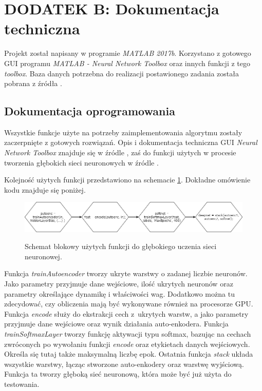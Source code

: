 \section{DODATEK B: Dokumentacja techniczna}
\label{sub:dodatekB}

Projekt został napisany w programie \textit{MATLAB 2017b}. Korzystano z gotowego GUI programu \textit{MATLAB - Neural Network Toolbox} oraz innych funkcji z tego \textit{toolbox}. Baza danych potrzebna do realizacji postawionego zadania została pobrana z źródła \cite{baza_down}.

\subsection{Dokumentacja oprogramowania}
\label{sub:dokumentacja}

Wszystkie funkcje użyte na potrzeby zaimplementowania algorytmu zostały zaczerpnięte z gotowych rozwiązań. Opis i dokumentacja techniczna GUI \textit{Neural Network Toolbox} znajduje się w źródle \cite{gui}, zaś do funkcji użytych w procesie tworzenia głębokich sieci neuronowych w źródle \cite{funkcje}.

\noindent Kolejność użytych funkcji przedstawiono na schemacie \ref{fig:flow}. Dokładne omówienie kodu znajduje się poniżej.

\vspace{0.6cm}

\begin{figure}[H]
	\centering
	\includegraphics[scale=0.45]{obrazki/flow}
	\caption{\label{fig:subcaption_example}Schemat blokowy użytych funkcji do głębokiego uczenia sieci neuronowej.}{\label{fig:flow}}
\end{figure}

\noindent Funkcja \textit{trainAutoencoder} tworzy ukryte warstwy o zadanej liczbie neuronów. Jako parametry przyjmuje dane wejściowe, ilość ukrytych neuronów oraz parametry określające dynamikę i właściwości wag. Dodatkowo można tu zdecydować, czy obliczenia mają być wykonywane również na procesorze GPU. Funkcja \textit{encode} służy do ekstrakcji cech z~ukrytych warstw, a jako parametry przyjmuje dane wejściowe oraz wynik działania auto-enkodera. Funkcja \textit{trainSoftmaxLayer} tworzy funkcję aktywacji typu softmax, bazując na cechach zwróconych po wywołaniu funkcji \textit{encode} oraz etykietach danych wejściowych. Określa się tutaj także maksymalną liczbę epok. Ostatnia funkcja \textit{stack} układa wszystkie warstwy, łącząc stworzone auto-enkodery oraz warstwę wyjściową. Funkcja ta tworzy głęboką sieć neuronową, która może być już użyta do testowania.


